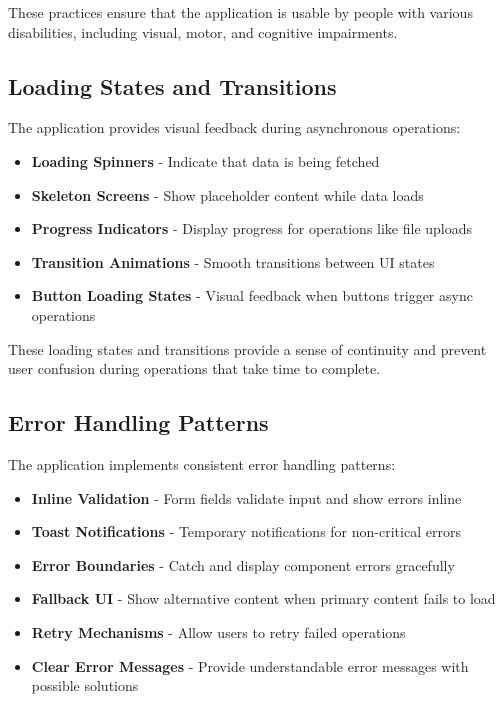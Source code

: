 These practices ensure that the application is usable by people with various disabilities, including visual, motor, and cognitive impairments.

\subsection{Loading States and Transitions}

The application provides visual feedback during asynchronous operations:

\begin{itemize}
  \item \textbf{Loading Spinners} - Indicate that data is being fetched
  \item \textbf{Skeleton Screens} - Show placeholder content while data loads
  \item \textbf{Progress Indicators} - Display progress for operations like file uploads
  \item \textbf{Transition Animations} - Smooth transitions between UI states
  \item \textbf{Button Loading States} - Visual feedback when buttons trigger async operations
\end{itemize}

These loading states and transitions provide a sense of continuity and prevent user confusion during operations that take time to complete.

\subsection{Error Handling Patterns}

The application implements consistent error handling patterns:

\begin{itemize}
  \item \textbf{Inline Validation} - Form fields validate input and show errors inline
  \item \textbf{Toast Notifications} - Temporary notifications for non-critical errors
  \item \textbf{Error Boundaries} - Catch and display component errors gracefully
  \item \textbf{Fallback UI} - Show alternative content when primary content fails to load
  \item \textbf{Retry Mechanisms} - Allow users to retry failed operations
  \item \textbf{Clear Error Messages} - Provide understandable error messages with possible solutions
\end{itemize}

